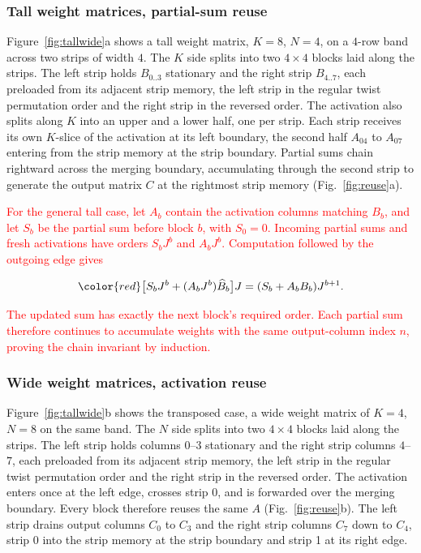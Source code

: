 \subsubsection{Tall weight matrices, partial-sum reuse}
\label{sec:design:mapping:klarge}
Figure~\ref{fig:tallwide}a shows a tall weight matrix, $K{=}8$, $N{=}4$, on a
$4$-row band across two strips of width $4$. The $K$ side splits
into two $4{\times}4$ blocks laid along the strips. The left strip holds
$B_{0..3}$ stationary and the right strip $B_{4..7}$, each preloaded
from its adjacent strip memory, the left strip in the regular twist
permutation order and the right strip in the reversed order. The activation also splits
along $K$ into an upper and a lower half, one per strip. Each
strip receives its own $K$-slice of the activation at its left
boundary, the second half $A_{04}$ to $A_{07}$ entering from the strip
memory at the strip boundary. Partial sums chain rightward across the
merging boundary, accumulating through the second strip to generate
the output matrix $C$ at the rightmost strip memory (Fig.~\ref{fig:reuse}a).

\begingroup
\textcolor{red}{For the general tall case, let $A_b$ contain the activation columns
matching $B_b$, and let $S_b$ be the partial sum before block $b$,
with $S_0=0$. Incoming partial sums and fresh activations have orders
$S_bJ^b$ and $A_bJ^b$. Computation followed by the outgoing edge gives}

\begin{equation}
\color{red}
 \bigl[S_bJ^b+(A_bJ^b)\widehat B_b\bigr]J
   =(S_b+A_bB_b)J^{b+1}.
 \label{eq:tall-invariant}
\end{equation}

\textcolor{red}{The updated sum has exactly the next block's required order.
Each partial sum therefore continues to accumulate weights with the
same output-column index $n$, proving the chain invariant by induction.}
\par
\endgroup

\subsubsection{Wide weight matrices, activation reuse}
\label{sec:design:mapping:ksmall}
Figure~\ref{fig:tallwide}b shows the transposed case, a wide weight matrix of
$K{=}4$, $N{=}8$ on the same band. The $N$ side splits into two
$4{\times}4$ blocks laid along the strips. The left strip holds
columns $0$--$3$ stationary and the right strip columns $4$--$7$, each
preloaded from its adjacent strip
memory, the left strip in the regular twist permutation order and the
right strip in the reversed order. The activation enters once at the left edge, crosses strip 0,
and is forwarded over the merging boundary. Every block
therefore reuses the same $A$ (Fig.~\ref{fig:reuse}b). The left strip drains output columns $C_0$ to $C_3$ and the right
strip columns $C_7$ down to $C_4$, strip 0 into the
strip memory at the strip boundary and strip 1 at its right edge.

